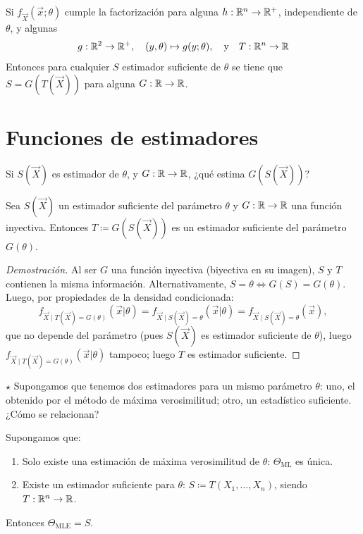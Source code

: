 \begin{teorema}
Si $f_{\vec{X}}(\vec{x};\theta)$ cumple la factorización para alguna $h : \mathbb{R}^n \to \mathbb{R}^+$, independiente de $\theta$, y algunas 
$$g : \mathbb{R}^2 \to \mathbb{R}^+, \quad (y,\theta) \mapsto g(y;\theta), \quad \text{y} \quad  T : \mathbb{R}^n \to \mathbb{R}$$
Entonces para cualquier $S$ estimador suficiente de $\theta$ se tiene que $S = G(T(\vec{X}))$ para alguna $G : \mathbb{R} \to \mathbb{R}$.
\end{teorema}

\section{Funciones de estimadores}

Si $S(\vec{X})$ es estimador de $\theta$, y $G : \mathbb{R} \to \mathbb{R}$, ¿qué estima $G(S(\vec{X}))$?

\begin{teorema}[5]
Sea $S(\vec{X})$ un estimador suficiente del parámetro $\theta$ y $G : \mathbb{R} \to \mathbb{R}$ una función inyectiva. Entonces $T \coloneqq G(S(\vec{X}))$ es un estimador suficiente del parámetro $G(\theta)$.
\end{teorema}

\begin{proof}[Demostración]
Al ser $G$ una función inyectiva (biyectiva en su imagen), $S$ y $T$ contienen la misma información. Alternativamente, $S = \theta \iff G(S) = G(\theta)$. Luego, por propiedades de la densidad condicionada:
\[
  f_{\vec{X} \mid T(\vec{X}) = G(\theta)}(\vec{x}|\theta) = f_{\vec{X} \mid S(\vec{X}) = \theta}(\vec{x}|\theta) = f_{\vec{X} \mid S(\vec{X}) = \theta}(\vec{x}),
\]
que no depende del parámetro (pues $S(\vec{X})$ es estimador suficiente de $\theta$), luego $f_{\vec{X} \mid T(\vec{X}) = G(\theta)}(\vec{x}|\theta)$ tampoco; luego $T$ es estimador suficiente.
\end{proof}

\noindent $\star$ Supongamos que tenemos dos estimadores para un mismo parámetro $\theta$: uno, el obtenido por el método de máxima verosimilitud; otro, un estadístico suficiente. ¿Cómo se relacionan?

\begin{proposicion}[8]
Supongamos que:
\begin{enumerate}
  \item Solo existe una estimación de máxima verosimilitud de $\theta$: $\Theta_{\text{ML}}$ es única.
  \item Existe un estimador suficiente para $\theta$: $S \coloneqq T(X_1, \dots, X_n)$, siendo $T : \mathbb{R}^n \to \mathbb{R}$.
\end{enumerate}
Entonces $\Theta_{\text{MLE}} = S$.
\end{proposicion}


